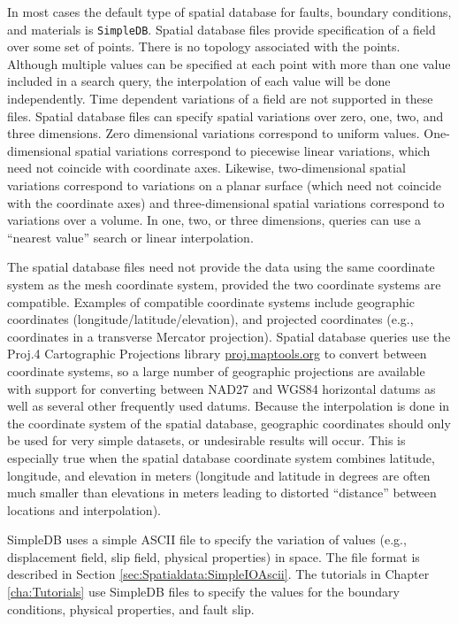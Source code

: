 In most cases the default type of spatial database for faults, boundary
conditions, and materials is \texttt{SimpleDB}. Spatial database files
provide specification of a field over some set of points. There is
no topology associated with the points. Although multiple values can
be specified at each point with more than one value included in a
search query, the interpolation of each value will be done independently.
Time dependent variations of a field are not supported in these files.
Spatial database files can specify spatial variations over zero, one,
two, and three dimensions. Zero dimensional variations correspond
to uniform values. One-dimensional spatial variations correspond to
piecewise linear variations, which need not coincide with coordinate
axes. Likewise, two-dimensional spatial variations correspond to variations
on a planar surface (which need not coincide with the coordinate axes)
and three-dimensional spatial variations correspond to variations
over a volume. In one, two, or three dimensions, queries can use a
``nearest value'' search or linear interpolation.

The spatial database files need not provide the data using the same
coordinate system as the mesh coordinate system, provided the two
coordinate systems are compatible. Examples of compatible coordinate
systems include geographic coordinates (longitude/latitude/elevation),
and projected coordinates (e.g., coordinates in a transverse Mercator
projection). Spatial database queries use the Proj.4 Cartographic
Projections library \url{proj.maptools.org} to convert between coordinate
systems, so a large number of geographic projections are available
with support for converting between NAD27 and WGS84 horizontal datums
as well as several other frequently used datums. Because the interpolation
is done in the coordinate system of the spatial database, geographic
coordinates should only be used for very simple datasets, or undesirable
results will occur. This is especially true when the spatial database
coordinate system combines latitude, longitude, and elevation in meters
(longitude and latitude in degrees are often much smaller than elevations
in meters leading to distorted ``distance'' between locations and
interpolation).

SimpleDB uses a simple ASCII file to specify the variation of values
(e.g., displacement field, slip field, physical properties) in space.
The file format is described in Section \vref{sec:Spatialdata:SimpleIOAscii}.
The tutorials in Chapter \vref{cha:Tutorials} use SimpleDB files to
specify the values for the boundary conditions,  physical properties,
and fault slip.

